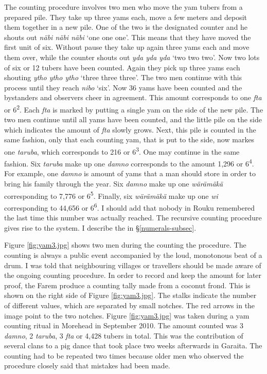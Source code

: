 The counting procedure involves two men who move the yam tubers from a prepared pile. They take up three yams each, move a few meters and deposit them together in a new pile. One of the two is the designated counter and he shouts out \emph{näbi näbi näbi} `one one one'. This means that they have moved the first unit of six. Without pause they take up again three yams each and move them over, while the counter shouts out \emph{yda yda yda} `two two two'. Now two lots of six or 12 tubers have been counted. Again they pick up three yams each shouting \emph{ytho ytho ytho} `three three three'. The two men continue with this process until they reach \emph{nibo} `six'. Now 36 yams have been counted and the bystanders and observers cheer in agreement. This amount corresponds to one \emph{fta} or 6\textsuperscript{2}. Each \emph{fta} is marked by putting a single yam on the side of the new pile. The two men continue until all yams have been counted, and the little pile on the side which indicates the amount of \emph{fta} slowly grows. Next, this pile is counted in the same fashion, only that each counting yam, that is put to the side, now markes one \emph{taruba}, which corresponds to 216 or 6\textsuperscript{3}. One may continue in the same fashion. Six \emph{taruba} make up one \emph{damno} corresponds to the amount 1,296 or 6\textsuperscript{4}. For example, one \emph{damno} is amount of yams that a man should store in order to bring his family through the year. Six \emph{damno} make up one \emph{wärämäkä} corresponding to 7,776 or 6\textsuperscript{5}. Finally, six \emph{wärämäkä} make up one \emph{wi} corresponding to 44,656 or 6\textsuperscript{6}. I should add that nobody in Rouku remembered the last time this number was actually reached. The recursive counting procedure gives rise to the  system. I describe the  in \S\ref{numerals-subsec}.

Figure \ref{fig:yam3.jpg} shows two men during the counting the procedure. The counting is always a public event accompanied by the loud, monotonous beat of a drum. I was told that neighbouring villages or travellers should be made aware of the ongoing counting procedure. In order to record and keep the amount for later proof, the Farem produce a counting tally made from a coconut frond. This is shown on the right side of Figure \ref{fig:yam3.jpg}. The stalks indicate the number of different  values, which are separated by small notches. The red arrows in the image point to the two notches. Figure  \ref{fig:yam3.jpg} was taken during a yam counting ritual in Morehead in September 2010. The amount counted was 3 \emph{damno}, 2 \emph{taruba}, 3 \emph{fta} or 4,428 tubers in total. This was the contribution of several clans to a pig dance that took place two weeks afterwards in Garaita. The counting had to be repeated two times because older men who observed the procedure closely said that mistakes had been made.

